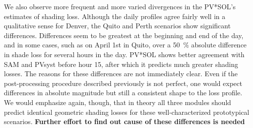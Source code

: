\documentclass[twocolumn,10pt]{asme2ej}
\begin{document}
We also observe more frequent and more varied divergences in the PV*SOL's estimates of shading loss.  Although the daily profiles agree fairly well in a qualitative sense for Denver, the Quito and Perth scenarios show significant differences.  Differences seem to be greatest at the beginning and end of the day, and in some cases, such as on April 1st in Quito, over a 50~\% absolute difference in shade loss for several hours in the day.  PV*SOL shows better agreement with SAM and PVsyst before hour 15, after which it predicts much greater shading losses.  The reasons for these differences are not immediately clear.  Even if the post-processing procedure described previously is not perfect, one would expect differences in absolute magnitude but still a consistent shape to the loss profile.   We would emphasize again, though, that in theory all three modules should predict identical geometric shading losses for these well-characterized prototypical scenarios.  \textbf{Further effort to find out cause of these differences is needed}
\end{document}
